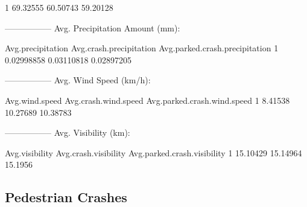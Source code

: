 \documentclass[11pt, a4paper]{article}
\begin{document}
\begin{Schunk}
\begin{Soutput}
1     69.32555           60.50743                  59.20128
\end{Soutput}
\begin{Soutput}
-----------------
Avg. Precipitation Amount (mm):
\end{Soutput}
\begin{Soutput}
  Avg.precipitation Avg.crash.precipitation Avg.parked.crash.precipitation
1        0.02998858              0.03110818                     0.02897205
\end{Soutput}
\begin{Soutput}
-----------------
Avg. Wind Speed (km/h):
\end{Soutput}
\begin{Soutput}
  Avg.wind.speed Avg.crash.wind.speed Avg.parked.crash.wind.speed
1        8.41538             10.27689                    10.38783
\end{Soutput}
\begin{Soutput}
-----------------
Avg. Visibility (km):
\end{Soutput}
\begin{Soutput}
  Avg.visibility Avg.crash.visibility Avg.parked.crash.visibility
1       15.10429             15.14964                     15.1956
\end{Soutput}
\end{Schunk}



\pagebreak
\subsection{Pedestrian Crashes}
\end{document}
